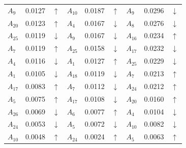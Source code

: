 \documentclass[final,5p,times,twocolumn,authoryear]{elsarticle}
\begin{document}
\begin{table}[ht!]
{\begin{tabular}{lrclrclrc}
$A_{9}$ & 0.0127 & $\uparrow$ & $A_{10}$ & 0.0187 & $\uparrow$ & $A_{9}$ & 0.0296 & $\downarrow$ \\
$A_{20}$ & 0.0123 & $\uparrow$ & $A_{4}$ & 0.0167 & $\downarrow$ & $A_{8}$ & 0.0276 & $\downarrow$ \\
$A_{25}$ & 0.0119 & $\downarrow$ & $A_{9}$ & 0.0167 & $\downarrow$ & $A_{16}$ & 0.0234 & $\uparrow$ \\
$A_{7}$ & 0.0119 & $\uparrow$ & $A_{25}$ & 0.0158 & $\downarrow$ & $A_{17}$ & 0.0232 & $\downarrow$ \\
$A_{4}$ & 0.0116 & $\downarrow$ & $A_{1}$ & 0.0127 & $\uparrow$ & $A_{25}$ & 0.0229 & $\downarrow$ \\
$A_{1}$ & 0.0105 & $\downarrow$ & $A_{18}$ & 0.0119 & $\downarrow$ & $A_{7}$ & 0.0213 & $\uparrow$ \\
$A_{17}$ & 0.0083 & $\uparrow$ & $A_{7}$ & 0.0112 & $\downarrow$ & $A_{24}$ & 0.0212 & $\uparrow$ \\
$A_{5}$ & 0.0075 & $\uparrow$ & $A_{17}$ & 0.0108 & $\downarrow$ & $A_{20}$ & 0.0160 & $\uparrow$ \\
$A_{26}$ & 0.0069 & $\downarrow$ & $A_{6}$ & 0.0077 & $\uparrow$ & $A_{4}$ & 0.0104 & $\downarrow$ \\
$A_{24}$ & 0.0053 & $\downarrow$ & $A_{5}$ & 0.0072 & $\downarrow$ & $A_{10}$ & 0.0082 & $\downarrow$ \\
$A_{10}$ & 0.0048 & $\uparrow$ & $A_{24}$ & 0.0024 & $\uparrow$ & $A_{5}$ & 0.0063 & $\uparrow$ \\ \bottomrule
\end{tabular}
}
\end{table}
%
\end{document}
